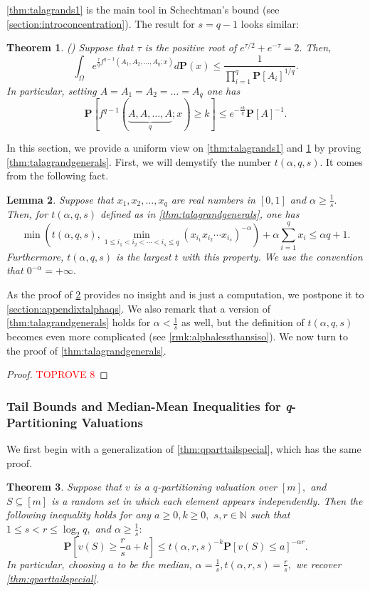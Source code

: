 \documentclass[11pt]{article}\usepackage{amsfonts}
\newtheorem{theorem}{Theorem}
\newtheorem{lemma}[theorem]{Lemma}
\numberwithin{theorem}{subsection}
\newcommand{\prob}{\mathbf{P}}
\def\hmath$#1${\texorpdfstring{{\rmfamily\textit{#1}}}{#1}}
\begin{document}
\noindent
\cref{thm:talagrands1} is the main tool in Schechtman's bound (see \cref{section:introconcentration}).
The result for $s = q-1$ looks similar:

\begin{theorem}
\label{thm:talagrandsq1}
(\cite[Theorem 5.4]{Talagrand96}) Suppose that $\tau$ is the positive root of $e^{\tau/2} +e^{-\tau} = 2.$ Then,
$$
\int_{\Omega}
e^{\frac{\tau}{q}f^{q-1}(A_1, A_2, \ldots, A_q; x)}d\prob(x)\le 
\frac{1}{\prod_{i=1}^q \prob[A_i]^{1/q}}.
$$
In particular, setting $A= A_1 = A_2= \ldots = A_q$ one has
$$\prob[f^{q-1}(\underbrace{A, A, \ldots, A}_{q}; x)\ge k]\le 
e^{-\frac{\tau k}{q}}\prob[A]^{-1}.$$
\end{theorem}

\noindent
In this section, we provide a uniform view on 
\cref{thm:talagrands1} and \cref{thm:talagrandsq1} by proving \cref{thm:talagrandgenerals}.
First, we will demystify the number $t(\alpha, q, s).$ It comes from the following fact.

\begin{lemma}
\label{lemma:talphaqs}
Suppose that $x_1, x_2, \ldots, x_q$ are real numbers in $[0,1]$ and $\alpha \ge \frac{1}{s}.$ Then, for $t(\alpha,q,s)$ defined as in \cref{thm:talagrandgenerals}, one has
$$
\min \left(
t(\alpha, q, s),
\min_{1\le i_1<i_2<\cdots <i_s\le q}
(x_{i_1}x_{i_2}\cdots x_{i_s})^{-\alpha}
\right)
+ \alpha \sum_{i = 1}^q x_i \le 
\alpha q + 1.
$$
Furthermore, $t(\alpha,q,s)$ is the largest $t$ with this property. We use the convention that $0^{-\alpha}  = +\infty.$
\end{lemma}

\noindent
As the proof of \cref{lemma:talphaqs} provides no insight and is just a computation, we postpone it to \cref{section:appendixtalphaqs}.
We also remark that a version of \cref{thm:talagrandgenerals} holds for $\alpha <\frac{1}{s}$ as well, but the definition of $t(\alpha,q,s)$ becomes even more complicated (see \cref{rmk:alphalessthansiso}).
We now turn to the proof of \cref{thm:talagrandgenerals}.

\begin{proof}\textcolor{red}{TOPROVE 8}\end{proof}


\subsubsection{Tail Bounds and Median-Mean Inequalities for \hmath$q$-Partitioning Valuations}
We first begin with a generalization of \cref{thm:qparttailspecial}, which has the same proof. 
\begin{theorem}
\label{thm:qparttail}
Suppose that $v$ is a $q$-partitioning valuation over $[m],$ and $S\subseteq [m]$ is a random set in which each element appears independently. Then the following inequality holds for any $ a \ge 0, k\ge 0,$ $s,r\in \mathbb{N}$ such that $1\le s < r\le \log_2 q,$ and $\alpha \ge \frac{1}{s}:$  
    $$
    \prob[v(S)\ge \frac{r}{s}a+k]\le 
    t(\alpha, r, s)^{-k}\prob[v(S)\le a]^{-\alpha r}.
    $$
    In particular, choosing $a$ to be the median, $\alpha = \frac{1}{s}, t(\alpha, r, s) = \frac{r}{s},$ we recover \cref{thm:qparttailspecial}.
\end{theorem}
\end{document}

